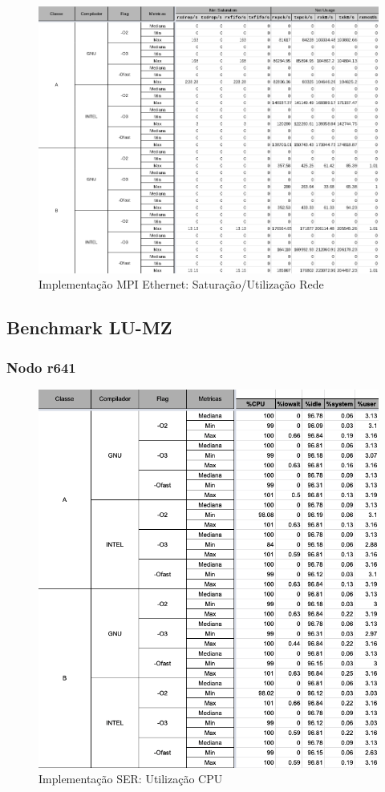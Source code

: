 \documentclass{article}
\begin{document}
\begin{appendices}
\begin{figure}[H]
    \centering
    \includegraphics[width=12cm]{Pictures/FT_r431_MPIE_NET.png} 
    \caption{Implementação MPI Ethernet: Saturação/Utilização Rede}
    \label{figure:FT_r431_MPIE_NET}
\end{figure}

\subsection{Benchmark LU-MZ}

\subsubsection{Nodo r641}

\begin{figure}[H]
    \centering
    \includegraphics[width=12cm]{Pictures/LUMZ_r641_SER_CPU.png}
    \caption{Implementação SER: Utilização CPU}
    \label{figure:LUMZ_r641_SER_CPU}
\end{figure}


\end{appendices}
\end{document}
